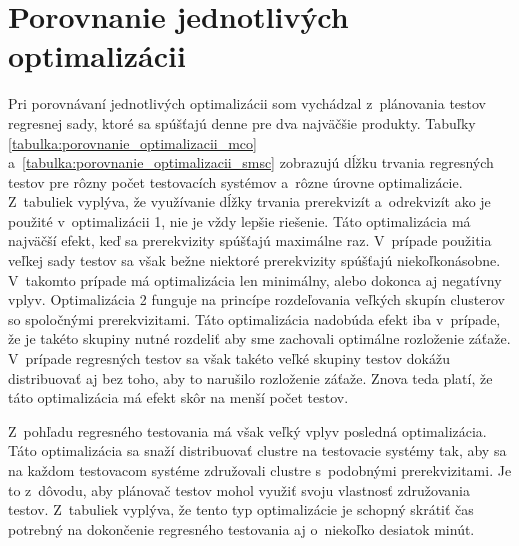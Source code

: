 \section{Porovnanie jednotlivých optimalizácii}
\label{sekcia:porovnanie_optimalizacii}
Pri porovnávaní jednotlivých optimalizácii som vychádzal z~plánovania testov
regresnej sady, ktoré sa spúšťajú denne pre dva najväčšie produkty. 
Tabuľky \ref{tabulka:porovnanie_optimalizacii_mco}
a~\ref{tabulka:porovnanie_optimalizacii_smsc} zobrazujú dĺžku trvania
regresných testov pre rôzny počet testovacích systémov a~rôzne úrovne
optimalizácie. Z~tabuliek vyplýva, že využívanie dĺžky trvania prerekvizít
a~odrekvizít ako je použité v~optimalizácii 1, nie je vždy lepšie riešenie.
Táto optimalizácia má najväčší efekt, keď sa prerekvizity spúšťajú maximálne
raz. V~prípade použitia veľkej sady testov sa však bežne niektoré prerekvizity
spúšťajú niekoľkonásobne. V~takomto prípade má optimalizácia len minimálny,
alebo dokonca aj negatívny vplyv. Optimalizácia 2 funguje na princípe rozdeľovania
veľkých skupín clusterov so spoločnými prerekvizitami. Táto optimalizácia
nadobúda efekt iba v~prípade, že je takéto skupiny nutné rozdeliť aby sme 
zachovali optimálne rozloženie záťaže. V~prípade regresných testov sa však 
takéto veľké skupiny testov dokážu distribuovať aj bez toho, aby to narušilo
rozloženie záťaže. Znova teda platí, že táto optimalizácia má efekt skôr na
menší počet testov. 

Z~pohľadu regresného testovania má však veľký vplyv posledná optimalizácia.
Táto optimalizácia sa snaží distribuovať clustre na testovacie systémy tak,
aby sa na každom testovacom systéme združovali clustre s~podobnými prerekvizitami.
Je to z~dôvodu, aby plánovač testov mohol využiť svoju vlastnosť združovania
testov. Z~tabuliek vyplýva, že tento typ optimalizácie je schopný skrátiť
čas potrebný na dokončenie regresného testovania aj o~niekoľko desiatok minút.


